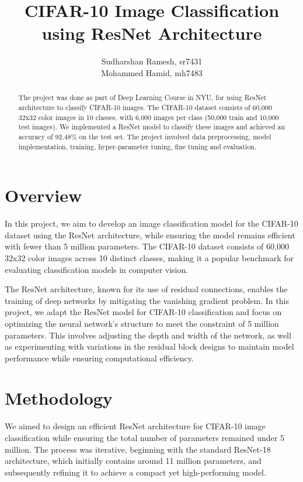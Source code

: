 \documentclass[twoside, 11pt]{article}
\begin{document}
\title{CIFAR-10 Image Classification using ResNet Architecture}
\author{Sudharshan Ramesh, sr7431\\ Mohammed Hamid, mh7483}
\maketitle

\begin{abstract}
    The project was done as part of Deep Learning Course in NYU, for using ResNet architecture to classify CIFAR-10 images. The CIFAR-10 dataset consists of 60,000 32x32 color images in 10 classes, with 6,000 images per class (50,000 train and 10,000 test images). We implemented a ResNet model to classify these images and achieved an accuracy of 92.48\% on the test set. The project involved data preprocessing, model implementation, training, hyper-parameter tuning, fine tuning and evaluation.
\end{abstract}

\section{Overview}
\label{sec:intro}
In this project, we aim to develop an image classification model for the CIFAR-10 dataset using the ResNet architecture, while ensuring the model remains efficient with fewer than 5 million parameters. The CIFAR-10 dataset consists of 60,000 32x32 color images across 10 distinct classes, making it a popular benchmark for evaluating classification models in computer vision.

The ResNet architecture, known for its use of residual connections, enables the training of deep networks by mitigating the vanishing gradient problem. In this project, we adapt the ResNet model for CIFAR-10 classification and focus on optimizing the neural network’s structure to meet the constraint of 5 million parameters. This involves adjusting the depth and width of the network, as well as experimenting with variations in the residual block designs to maintain model performance while ensuring computational efficiency.

\section{Methodology}
\label{sec:method}
We aimed to design an efficient ResNet architecture for CIFAR-10 image classification while ensuring the total number of parameters remained under 5 million. The process was iterative, beginning with the standard ResNet-18 architecture, which initially contains around 11 million parameters, and subsequently refining it to achieve a compact yet high-performing model.
\end{document}
